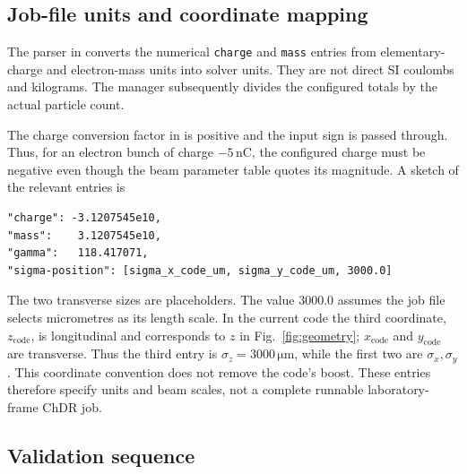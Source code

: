 \documentclass[11pt,a4paper]{article}
\newcommand{\unit}[1]{\,\mathrm{#1}}
\newcommand{\code}[1]{\texttt{\small #1}}
\numberwithin{equation}{section}
\begin{document}
\subsection{Job-file units and coordinate mapping}

The parser in  converts the numerical
\code{charge} and \code{mass} entries from elementary-charge and
electron-mass units into solver units. They are not direct SI coulombs
and kilograms. The manager subsequently divides the configured totals
by the actual particle count.

The charge conversion factor in  is positive and
the input sign is passed through. Thus, for an electron bunch of charge
\(-5\unit{nC}\), the configured charge must be negative even though the beam
parameter table quotes its magnitude. A sketch of the relevant entries is
\begin{verbatim}
"charge": -3.1207545e10,
"mass":    3.1207545e10,
"gamma":   118.417071,
"sigma-position": [sigma_x_code_um, sigma_y_code_um, 3000.0]
\end{verbatim}
The two transverse sizes are placeholders. The value \(3000.0\) assumes
the job file selects micrometres as its length scale. In the current code
the third coordinate, \(z_{\mathrm{code}}\), is longitudinal and corresponds
to \(z\) in Fig.~\ref{fig:geometry}; \(x_{\mathrm{code}}\) and
\(y_{\mathrm{code}}\) are transverse. Thus the third entry is
\(\sigma_z=3000\unit{\mu m}\), while the first two are \(\sigma_x,\sigma_y\).
This coordinate convention does not remove the code's boost.
These entries therefore specify units
and beam scales, not a complete runnable laboratory-frame ChDR job.

\subsection{Validation sequence}
\end{document}
